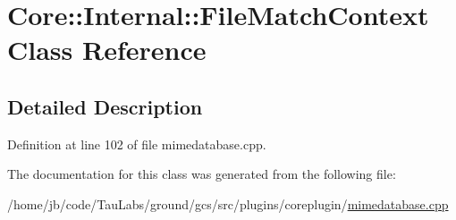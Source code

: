 \hypertarget{class_core_1_1_internal_1_1_file_match_context}{\section{\-Core\-:\-:\-Internal\-:\-:\-File\-Match\-Context \-Class \-Reference}
\label{class_core_1_1_internal_1_1_file_match_context}
}


\subsection{\-Detailed \-Description}


\-Definition at line 102 of file mimedatabase.\-cpp.



\-The documentation for this class was generated from the following file\-:\begin{DoxyCompactItemize}
\item 
/home/jb/code/\-Tau\-Labs/ground/gcs/src/plugins/coreplugin/\hyperlink{mimedatabase_8cpp}{mimedatabase.\-cpp}\end{DoxyCompactItemize}
